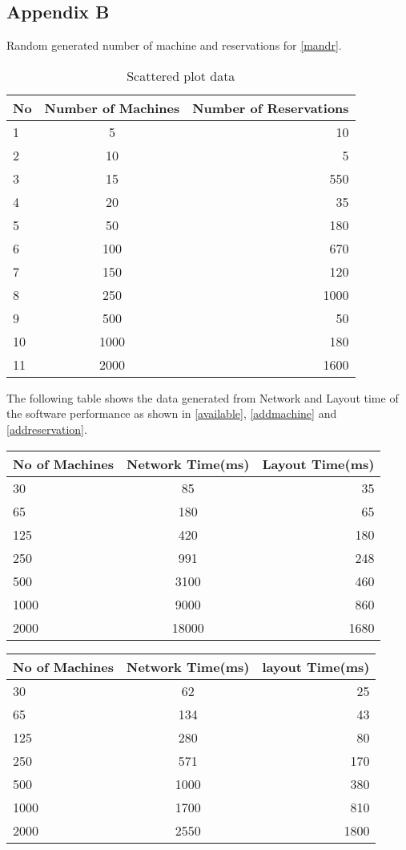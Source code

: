\begin{appendices}
\chapter{Appendix B}
Random generated number of machine and reservations for \autoref{mandr}.
\begin{table}[h!]
  \label{tab:Scattered plot data}
  \begin{tabular}{l|c||r}
    No & Number of Machines & Number of Reservations\\
    \hline
    1 &5 &10  \\
    2 &10 &5 \\
    3 & 15&550  \\
    4 & 20&35  \\
    5 & 50&180  \\
    6 &100 &670 \\
    7&150&120 \\
    8&250&1000 \\
    9&500&50 \\
    10&1000&180 \\
    11&2000&1600 \\
  \end{tabular}
  \caption{Scattered plot data}
\end{table}

The following table shows the data generated from Network and Layout time of the software performance as  shown in \autoref{available}, \autoref{addmachine} and \autoref{addreservation}.
\begin{table}[h!]
\label{tab:availabledata}
\begin{tabular}{l|c||r}
No of Machines & Network Time(ms) & Layout Time(ms)\\
\hline
30&85&35 \\
65&180&65 \\
125&420&180 \\
250&991&248 \\
500&3100&460 \\
1000&9000&860 \\
2000&18000&1680 \\ 
\end{tabular}
\end{table}

\begin{table}[h!]
\label{tab:availabledata}
\begin{tabular}{l|c||r}
No of Machines & Network Time(ms) & layout Time(ms)\\
\hline
30&62&25 \\
65&134&43 \\
125&280&80 \\
250&571&170 \\
500&1000&380 \\
1000&1700&810 \\
2000&2550&1800 \\ 
\end{tabular}
\end{table}


\end{appendices}
